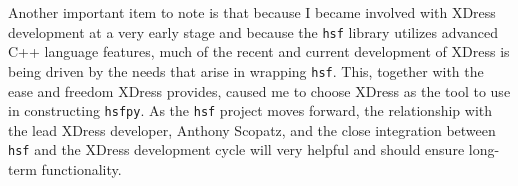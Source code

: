     Another important item to note is that because I became involved with XDress development at a very early stage and because the \texttt{hsf} library utilizes advanced C++ language features, much of the recent and current development of XDress is being driven by the needs that arise in wrapping \texttt{hsf}. This, together with the ease and freedom XDress provides, caused me to choose XDress as the tool to use in constructing \texttt{hsfpy}. As the \texttt{hsf} project moves forward, the relationship with the lead XDress developer, Anthony Scopatz, and the close integration between \texttt{hsf} and the XDress development cycle will very helpful and should ensure long-term functionality.

